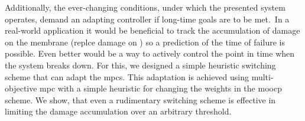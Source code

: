 Additionally, the ever-changing conditions, under which the presented system operates, demand an adapting controller if long-time goals are to be met.\ In a real-world application it would be beneficial to track the accumulation of damage on the membrane (\todo replce damage on ) so a prediction of the time of failure is possible. Even better would be a way to actively control the point in time when the system breaks down. For this, we designed a simple heuristic switching scheme that can adapt the \acp{mpc}. 
This adaptation is achieved using multi-objective \ac{mpc} with a simple heuristic for changing the weights in the \ac{moocp} scheme.
We show, that even a rudimentary switching scheme is effective in limiting the damage accumulation over an arbitrary threshold.
